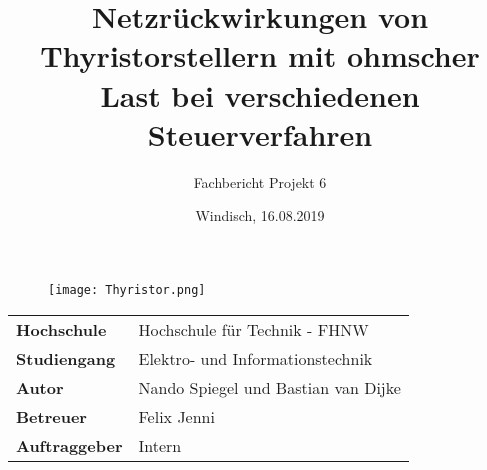 \documentclass[final]{fhnwreport}       %
\title{Netzrückwirkungen von Thyristorstellern mit ohmscher Last bei verschiedenen Steuerverfahren}          %
\author{Fachbericht Projekt 6}          %
\date{Windisch, 16.08.2019}             %
\begin{document}
\maketitle

\vspace*{-1cm}						    %
\vfill
\begin{figure}[H]
\centering
\texttt{[image: Thyristor.png]}
\end{figure}
\vfill

{
\renewcommand\arraystretch{2}
\begin{center}
\begin{tabular}{>{\bf}p{4cm} l}
Hochschule                 &    Hochschule für Technik - FHNW\\
Studiengang                &    Elektro- und Informationstechnik\\
Autor   		           & 	Nando Spiegel und Bastian van Dijke\\
Betreuer                   &    Felix Jenni\\
Auftraggeber               &    Intern\\
\end{tabular}
\end{center}
}

\clearpage
			
\thispagestyle{empty}

%

\tableofcontents
\clearpage










{\sloppypar
\printbibliography[heading=bibintoc]
\label{sec:lit}
}
\listoffigures
\listoftables


\ifdraft{%
\newpage
\clearpage
}
{%
}
\end{document}
